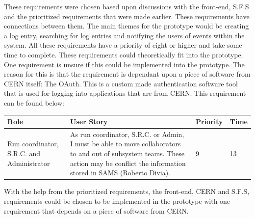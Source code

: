 \documentclass[paper=a4, fontsize=11pt,twoside]{scrartcl}	%
\begin{document}
These requirements were chosen based upon discussions with the front-end, S.F.S and the prioritized requirements that were made earlier. These requirements have connections between them. The main themes for the prototype would be creating a log entry, searching for log entries and notifying the users of events within the system. All these requirements have a priority of eight or higher and take some time to complete. These requirements could theoretically fit into the prototype. One requirement is unsure if this could be implemented into the prototype. The reason for this is that the requirement is dependant upon a piece of software from CERN itself: The OAuth. This is a custom made authentication software tool that is used for logging into applications that are from CERN. This requirement can be found below: \\

\begin{longtable}{ | p{3cm} | p{8cm} | p{1.5cm} | l |}
\hline
Role & User Story & Priority & Time \\ \hline
Run coordinator, S.R.C. and Administrator &  As run coordinator, S.R.C. or Admin, I must be able to move collaborators to and out of subsystem teams. These action may be conflict the information stored in SAMS (Roberto Divia). & 9 & 13 \\ \hline
\end{longtable}

With the help from the prioritized requirements, the front-end, CERN and S.F.S, requirements could be chosen to be implemented in the prototype with one requirement that depends on a piece of software from CERN.
\newpage
\end{document}
